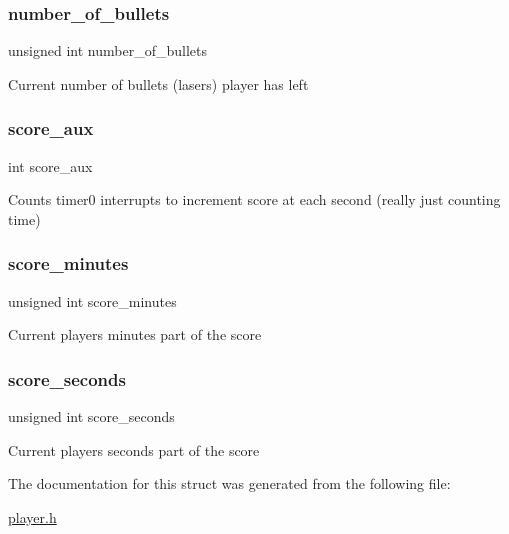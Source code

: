 \subsubsection{\texorpdfstring{number\+\_\+of\+\_\+bullets}{number\_of\_bullets}}
{\footnotesize\ttfamily unsigned int number\+\_\+of\+\_\+bullets}

Current number of bullets (lasers) player has left \hypertarget{struct_player_aa7c2d82515de928df40dec915c3ba081}{}\label{struct_player_aa7c2d82515de928df40dec915c3ba081} 
\subsubsection{\texorpdfstring{score\+\_\+aux}{score\_aux}}
{\footnotesize\ttfamily int score\+\_\+aux}

Counts timer0 interrupts to increment score at each second (really just counting time) \hypertarget{struct_player_a9ebf860aa3d67f9f3229afa365dbd2df}{}\label{struct_player_a9ebf860aa3d67f9f3229afa365dbd2df} 
\subsubsection{\texorpdfstring{score\+\_\+minutes}{score\_minutes}}
{\footnotesize\ttfamily unsigned int score\+\_\+minutes}

Current player\textquotesingle{}s minutes part of the score \hypertarget{struct_player_ac5b57794eda52960699e7304de9ed640}{}\label{struct_player_ac5b57794eda52960699e7304de9ed640} 
\subsubsection{\texorpdfstring{score\+\_\+seconds}{score\_seconds}}
{\footnotesize\ttfamily unsigned int score\+\_\+seconds}

Current player\textquotesingle{}s seconds part of the score 

The documentation for this struct was generated from the following file\+:\begin{DoxyCompactItemize}
\item 
\hyperlink{player_8h}{player.\+h}\end{DoxyCompactItemize}
